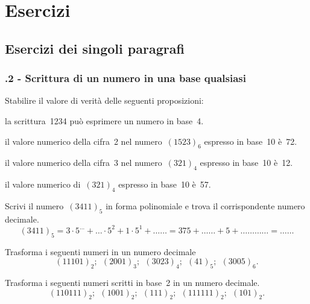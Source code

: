\section{Esercizi}
\subsection{Esercizi dei singoli paragrafi}
\subsubsection*{\thechapter.2 - Scrittura di un numero in una base qualsiasi}

\begin{esercizio}
\label{ese:4.1}
Stabilire il valore di verità delle seguenti proposizioni:
\begin{enumeratea}
\TabPositions{12cm}
\item la scrittura~1234 può esprimere un numero in base~4. \tab\boxV\quad\boxF
\item il valore numerico della cifra~2 nel numero~$(1523)_{6}$ espresso in base~10 è~72.\tab\boxV\quad\boxF
\item il valore numerico della cifra~3 nel numero~$(321)_{4}$ espresso in base~10 è~12. \tab\boxV\quad\boxF
\item il valore numerico di~$(321)_{4}$ espresso in base~10 è~57. \tab\boxV\quad\boxF
\end{enumeratea}
\end{esercizio}

\begin{esercizio}
\label{ese:4.2}
Scrivi il numero~$(3411)_{5}$ in forma polinomiale e trova il corrispondente numero decimale.
\[
(3411)_{5}=3\cdot 5^{\ldots }+\ldots \cdot 5^{2}+1\cdot5^{1}+\ldots\ldots =375+\ldots\ldots +5+\ldots%
\ldots\ldots\ldots =\ldots\ldots\]
\end{esercizio}

\begin{esercizio}
\label{ese:4.3}
Trasforma i seguenti numeri in un numero
decimale
\[(11101)_{2};\:\:(2001)_{3};\:\:(3023)_{4};\:\:(41)_{5};\:\:(3005)_{6}.\]
\end{esercizio}

\begin{esercizio}
\label{ese:4.4}
Trasforma i seguenti numeri scritti in base~2 in un numero decimale.
\[(110111)_{2};\:\:(1001)_{2};\:\:(111)_{2};\:\:(111111)_{2};\:\:(101)_{2}.\]
\end{esercizio}

